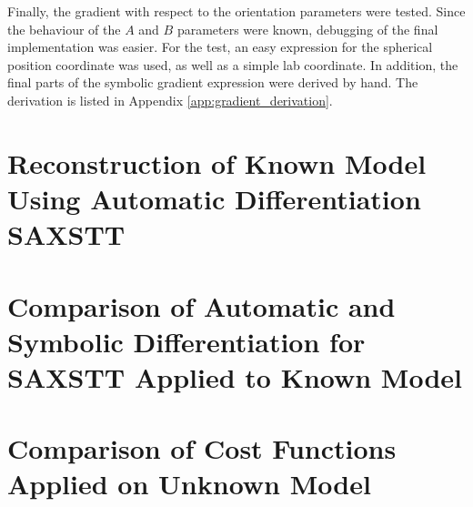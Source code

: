 Finally, the gradient with respect to the orientation parameters were tested.
Since the behaviour of the $A$ and $B$ parameters were known, debugging of the final implementation was easier. %
For the test, an easy expression for the spherical position coordinate was used, as well as a simple lab coordinate. %
In addition, the final parts of the symbolic gradient expression were derived by hand. The derivation is listed in Appendix \ref{app:gradient_derivation}.




\section{Reconstruction of Known Model Using Automatic Differentiation SAXSTT}


\section{Comparison of Automatic and Symbolic Differentiation for SAXSTT Applied to Known Model}



\section{Comparison of Cost Functions Applied on Unknown Model}%